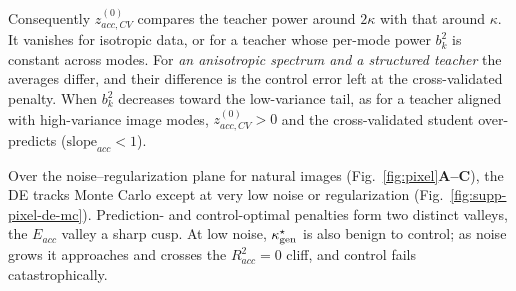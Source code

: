 Consequently $z^{(0)}_{acc,CV}$ compares the teacher power around $2\kappa$ with that around $\kappa$.
It vanishes for isotropic data, or for a teacher whose per-mode power $b_k^2$ is constant across modes. %
For \textit{an anisotropic spectrum and a structured teacher} the averages differ, and their difference is the control error left at the cross-validated penalty. When $b_k^2$ decreases toward the low-variance tail, as for a teacher aligned with high-variance image modes, $z^{(0)}_{acc,CV}>0$ and the cross-validated student over-predicts ($\mathrm{slope}_{acc}<1$). %


Over the noise--regularization plane for natural images (Fig.~\ref{fig:pixel}\textbf{A--C}), the DE tracks Monte Carlo except at very low noise or regularization (Fig.~\ref{fig:supp-pixel-de-mc}). Prediction- and control-optimal penalties form two distinct valleys, the $E_{acc}$ valley a sharp cusp. At low noise, $\kappa^\star_{\rm gen}$ is also benign to control; as noise grows it approaches and crosses the $R^2_{acc}=0$ cliff, and control fails catastrophically. %

